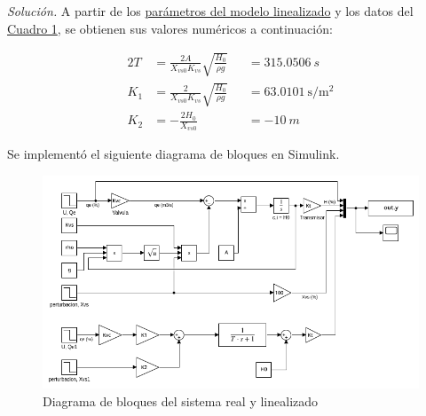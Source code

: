 \textit{Solución.} A partir de los \hyperref[eq3]{parámetros del modelo linealizado} y los datos del \hyperref[t1]{Cuadro 1}, se obtienen sus valores numéricos a continuación:

\begin{alignat*}{2}
    T &= \frac{2A}{X _{vs0} K _{vs}} \sqrt{ \frac{H_0}{\rho g}} &&= \SI{315.0506}{s}\\
    K _{1} &= \frac{2}{X _{vs0} K _{vs}} \sqrt{ \frac{H_0}{\rho g}} &&= \SI{63.0101}{\second\per\metre\squared}\\
    K _{2} &= - \frac{2 H_0}{X _{vs0}} &&= \SI{-10}{m}
\end{alignat*}

\newpage

Se implementó el siguiente diagrama de bloques en Simulink.

\begin{figure}[!h]
    \centering
    \includegraphics[width = 0.6\linewidth]{figs/fig3.png}
    \caption{Diagrama de bloques del sistema real y linealizado}
    \label{fig3}
\end{figure}
